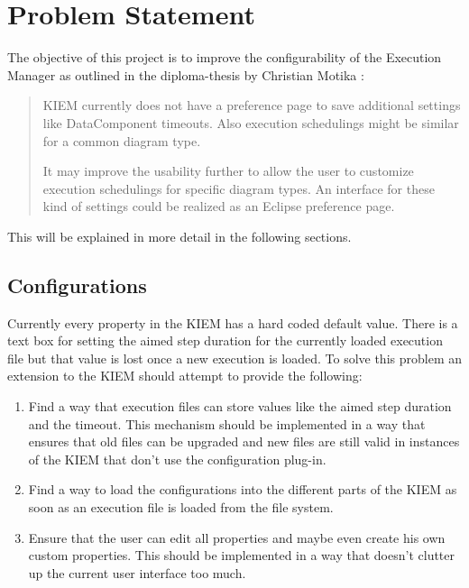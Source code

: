 \chapter{Problem Statement}
\label{chapter:ConfTask}
The objective of this project is to improve the configurability of the
Execution Manager as outlined in the diploma-thesis by Christian Motika\cite{cmot-dt} :
\begin{quote}
 \ac{KIEM} currently does not have a preference page to save
additional settings like DataComponent timeouts. Also execution schedulings
might be similar for a common diagram type.

It may improve the usability further to allow the user to customize execution
schedulings for specific diagram types. An interface for these kind of settings
could be realized as an Eclipse preference page.
\end{quote}
This will be explained in more detail in the following sections.
\section{Configurations}
Currently every property in the \ac{KIEM} has a hard coded default value. There is a text box
for setting the aimed step duration for the currently loaded execution file but that value
is lost once a new execution is loaded.
To solve this problem an extension to the \ac{KIEM} should attempt to provide the following:
\begin{enumerate}
 \item Find a way that execution files can store values like the aimed step duration and the timeout.
This mechanism should be implemented in a way that ensures that old files can be upgraded and new
files are still valid in instances of the \ac{KIEM} that don't use the configuration plug-in.
 \item Find a way to load the configurations into the different parts of the \ac{KIEM} as soon as an
execution file is loaded from the file system.
 \item Ensure that the user can edit all properties and maybe even create his own custom properties.
This should be implemented in a way that doesn't clutter up the current user interface too much.
\end{enumerate}



